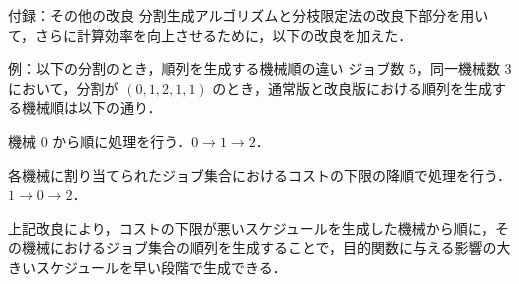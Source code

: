 \documentclass[dvipdfmx]{beamer}
\begin{document}
    \begin{frame}{付録：その他の改良}
      分割生成アルゴリズムと分枝限定法の改良下部分を用いて，さらに計算効率を向上させるために，以下の改良を加えた．
      \begin{exampleblock}{例：以下の分割のとき，順列を生成する機械順の違い}
        ジョブ数 $5$，同一機械数 $3$ において，分割が $(0,1,2,1,1)$ のとき，通常版と改良版における順列を生成する機械順は以下の通り．
        \begin{description}
          \setlength{\leftskip}{-8mm}
          \item[通常版 ] 機械 $0$ から順に処理を行う．$0 \to 1 \to 2$．
          \item[改良版 ] 各機械に割り当てられたジョブ集合におけるコストの下限の降順で処理を行う．$1 \to 0 \to 2$．
        \end{description}
      \end{exampleblock}
      \begin{block}{}
        上記改良により，コストの下限が悪いスケジュールを生成した機械から順に，その機械におけるジョブ集合の順列を生成することで，目的関数に与える影響の大きいスケジュールを早い段階で生成できる．
      \end{block}
    \end{frame}
    
\end{document}
